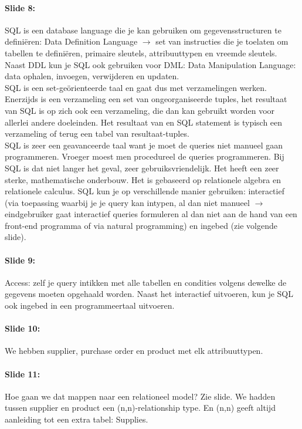 \documentclass[10pt,a4paper]{report}
\begin{document}
\paragraph{Slide 8:}SQL is een database language die je kan gebruiken om gegevensstructuren te definiëren: Data Definition Language $\rightarrow$ set van instructies die je toelaten om tabellen te definiëren, primaire sleutels, attribuuttypen en vreemde sleutels. Naast DDL kun je SQL ook gebruiken voor DML: Data Manipulation Language: data ophalen, invoegen, verwijderen en updaten.\\
SQL is een set-geörienteerde taal en gaat dus met verzamelingen werken. Enerzijds is een verzameling een set van ongeorganiseerde tuples, het resultaat van SQL is op zich ook een verzameling, die dan kan gebruikt worden voor allerlei andere doeleinden. Het resultaat van en SQL statement is typisch een verzameling of terug een tabel van resultaat-tuples.\\
SQL is zeer een geavanceerde taal want je moet de queries niet manueel gaan programmeren. Vroeger moest men procedureel de queries programmeren. Bij SQL is dat niet langer het geval, zeer gebruiksvriendelijk. Het heeft een zeer sterke, mathematische onderbouw. Het is gebaseerd op relationele algebra en relationele calculus.
SQL kun je op verschillende manier gebruiken: interactief (via toepassing waarbij je je query kan intypen, al dan niet manueel $\rightarrow$ eindgebruiker gaat interactief queries formuleren al dan niet aan de hand van een front-end programma of via natural programming) en ingebed (zie volgende slide).

\paragraph{Slide 9:}Access: zelf je query intikken met alle tabellen en condities volgens dewelke de gegevens moeten opgehaald worden. Naast het interactief uitvoeren, kun je SQL ook ingebed in een programmeertaal uitvoeren.

\paragraph{Slide 10:}We hebben supplier, purchase order en product met elk attribuuttypen. 

\paragraph{Slide 11:}Hoe gaan we dat mappen naar een relationeel model? Zie slide. We hadden tussen supplier en product een (n,n)-relationship type. En (n,n) geeft altijd aanleiding tot een extra tabel: Supplies.
\end{document}
